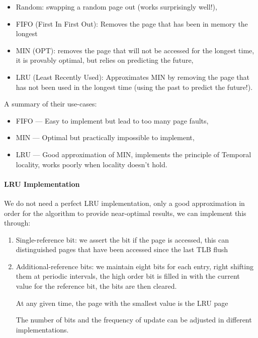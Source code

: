\documentclass[openright, twoside]{report}
\theoremstyle{definition}
\theoremstyle{example}
\begin{document}
\begin{itemize}
	\item Random: swapping a random page out (works surprisingly well!),
	\item FIFO (First In First Out): Removes the page that has been in memory the longest
	\item MIN (OPT): removes the page that will not be accessed for the longest time, 
	it is provably optimal, but relies on predicting the future,
	\item LRU (Least Recently Used): Approximates MIN by removing the page that has not 
	been used in the longest time (using the past to predict the future!).
\end{itemize}

A summary of their use-cases:
\begin{itemize}
	\item FIFO --- Easy to implement but lead to too many page faults,
	\item MIN --- Optimal but practically impossible to implement,
	\item LRU --- Good approximation of MIN, implements the principle of 
	Temporal locality, works poorly when locality doesn't hold.
\end{itemize}

\paragraph{LRU Implementation}
We do not need a perfect LRU implementation, only a good approximation in order for 
the algorithm to provide near-optimal results, we can implement this through:

\begin{enumerate}
	\item Single-reference bit: we assert the bit if the page is accessed, this can 
	distinguished pages that have been accessed since the last TLB flush
	\item Additional-reference bits: we maintain eight bits for each entry, right 
	shifting them at periodic intervals, the high order bit is filled in with 
	the current value for the reference bit, the bits are then cleared.

	\begin{center}
		At any given time, the page with the smallest value is the LRU page
	\end{center}
	
	The number of bits and the frequency of update can be adjusted in different implementations.
\end{enumerate}
\end{document}
